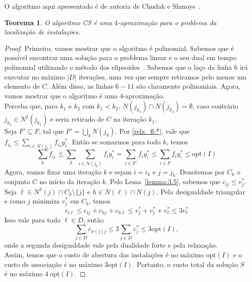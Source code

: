 \documentclass[12pt]{article}
\newcommand{\opt}{\ensuremath{\mathrm{opt}}}
\newtheorem{theorem}{Teorema}[section]
\begin{document}
O algoritmo aqui apresentado é de autoria de Chudak e Shmoys~\cite{Chudak2003}.
\begin{theorem}
    O algoritmo {\sc CS} é uma $4$-aproximação para o problema da localização de instalações.
\end{theorem}
\begin{proof}
    Primeiro, vamos mostrar que o algoritmo é polinomial. Sabemos que é possível encontrar uma solução para o problema linear e o seu dual em tempo polinomial utilizando o método dos elipsoides~\cite{Kha79}. Sabemos que o laço da linha 6 irá executar no máximo $|D|$ iterações, uma vez que sempre retiramos pelo menos um elemento de $C$. Além disso, as linhas $6-11$ são claramente polinomiais.
    Agora, vamos mostrar que o algoritmo é uma $4$-aproximação.\\
    Perceba que, para $k_1$ e $k_2$ com $k_1 < k_2$, $N(j_{k_1})\cap N(j_{k_2}) = \emptyset$, caso contrário $j_{k_2} \in N^2(j_{k_1})$ e seria retirado de $C$ na iteração $k_1$.\\
    Seja $F' \subseteq F$, tal que $F' = \bigcup_k N(j_k)$.
    Por \eqref{relx_fl:*}, vale que $f_{i_k} \leq \sum_{i \in N(j_k)}f_{i_k}y^*_{i}$. Então se somarmos para todo $k$, temos
    \[ \sum_kf_{i_k} \leq \sum_k \sum_{i \in N(j_k)}f_{i}y^*_{i} = \sum_{i \in F'}f_{i}y^*_{i} \leq \sum_{i \in F}f_{i}y^*_{i} \leq \opt(I)\]
    Agora, vamos fixar uma iteração $k$ e sejam $i = i_k$ e $j = j_k$. Denotemos por $C_k$ o conjunto $C$ no início da iteração $k$. Pelo Lema~\ref{lemma:3.5}, sabemos que $c_{ij} \leq v^*_j$. Seja $\ell \in N^2(j) \cap C_k \setminus \{j\}$ e $h \in N(\ell) \cap N(j)$. Pela desigualdade triangular e como $j$ minimiza $v^*_j$ em $C_k$, temos
    \[ c_{i\ell} \leq c_{ij} + c_{hj} + c_{h\ell} \leq v_j^* + v_j^* + v_{\ell}^* \leq 3 v_{\ell}^*
        \]
    Isso vale para todo $\ell \in D$, então
    \[\sum_{j\in D} c_{\sigma(j)j} \leq 3 \sum_{j \in D} v^*_j \leq 3\opt(I),\]
    onde a segunda desigualdade vale pela dualidade forte e pela relaxação. \\
    Assim, temos que o custo de abertura das instalações é no máximo $\opt(I)$ e o custo de associação é no máximo $3\opt(I)$. Portanto, o custo total da solução $S$ é no máximo $4~\opt(I)$.
\end{proof}

\newpage
\end{document}
